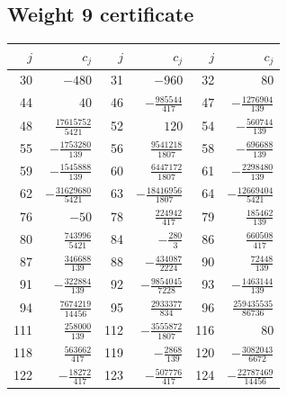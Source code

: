 \documentclass[11pt,letterpaper]{article}
\numberwithin{equation}{section}
\theoremstyle{definition}\newtheorem{definition}[theorem]{Definition}
\theoremstyle{remark}\newtheorem{remark}[theorem]{Remark}
\begin{document}
\subsection*{Weight 9 certificate}
\begin{center}
\small
\begin{tabular}{rr@{\qquad}rr@{\qquad}rr}
\toprule
$j$&$c_j$&$j$&$c_j$&$j$&$c_j$\\
\midrule

30&$-480$&31&$-960$&32&$80$\\[3pt]

44&$40$&46&$- \frac{985544}{417}$&47&$- \frac{1276904}{139}$\\[3pt]

48&$\frac{17615752}{5421}$&52&$120$&54&$- \frac{560744}{139}$\\[3pt]

55&$- \frac{1753280}{139}$&56&$\frac{9541218}{1807}$&58&$- \frac{696688}{139}$\\[3pt]

59&$- \frac{1545888}{139}$&60&$\frac{6447172}{1807}$&61&$- \frac{2298480}{139}$\\[3pt]

62&$- \frac{31629680}{5421}$&63&$- \frac{18416956}{1807}$&64&$- \frac{12669404}{5421}$\\[3pt]

76&$-50$&78&$\frac{224942}{417}$&79&$\frac{185462}{139}$\\[3pt]

80&$\frac{743996}{5421}$&84&$- \frac{280}{3}$&86&$\frac{660508}{417}$\\[3pt]

87&$\frac{346688}{139}$&88&$- \frac{434087}{2224}$&90&$\frac{72448}{139}$\\[3pt]

91&$- \frac{322884}{139}$&92&$- \frac{9854045}{7228}$&93&$- \frac{1463144}{139}$\\[3pt]

94&$\frac{7674219}{14456}$&95&$\frac{2933377}{834}$&96&$\frac{259435535}{86736}$\\[3pt]

111&$\frac{258000}{139}$&112&$- \frac{3555872}{1807}$&116&$80$\\[3pt]

118&$\frac{563662}{417}$&119&$- \frac{2868}{139}$&120&$- \frac{3082043}{6672}$\\[3pt]

122&$- \frac{18272}{417}$&123&$- \frac{507776}{417}$&124&$- \frac{22787469}{14456}$\\[3pt]


\end{tabular}
\end{center}
\end{document}
